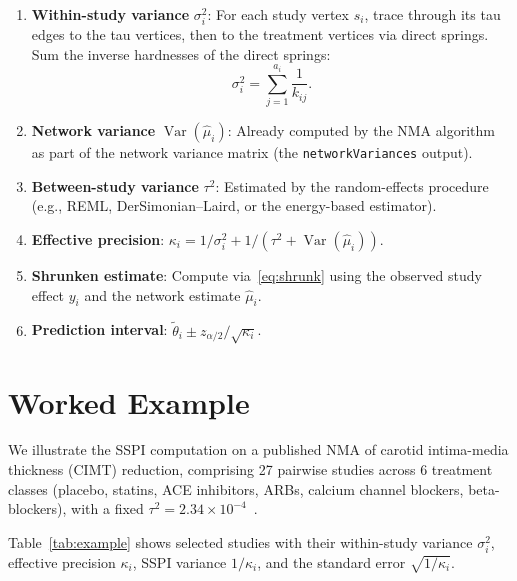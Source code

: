 \documentclass[12pt]{article}
\newcommand{\Var}{\operatorname{Var}}
\begin{document}
\begin{enumerate}
  \item \textbf{Within-study variance} $\sigma_i^2$: For each study
    vertex $s_i$, trace through its tau edges to the tau vertices, then
    to the treatment vertices via direct springs.  Sum the inverse
    hardnesses of the direct springs:
    \begin{equation}
      \sigma_i^2 = \sum_{j=1}^{a_i} \frac{1}{k_{ij}}.
    \end{equation}

  \item \textbf{Network variance} $\Var(\hat\mu_i)$: Already computed
    by the NMA algorithm as part of the network variance matrix
    (the \texttt{networkVariances} output).

  \item \textbf{Between-study variance} $\tau^2$: Estimated by the
    random-effects procedure (e.g., REML, DerSimonian--Laird, or the
    energy-based estimator).

  \item \textbf{Effective precision}:
    $\kappa_i = 1/\sigma_i^2 + 1/(\tau^2 + \Var(\hat\mu_i))$.

  \item \textbf{Shrunken estimate}: Compute via~\eqref{eq:shrunk}
    using the observed study effect $y_i$ and the network
    estimate $\hat\mu_i$.

  \item \textbf{Prediction interval}: $\tilde\theta_i \pm z_{\alpha/2}/\sqrt{\kappa_i}$.
\end{enumerate}


\section{Worked Example}\label{sec:example}

We illustrate the SSPI computation on a published NMA of carotid
intima-media thickness (CIMT) reduction, comprising 27 pairwise studies
across 6 treatment classes (placebo, statins, ACE inhibitors, ARBs,
calcium channel blockers, beta-blockers), with a fixed
$\tau^2 = 2.34 \times 10^{-4}$~\citep{Papakonstantinou2024}.

Table~\ref{tab:example} shows selected studies with their within-study
variance $\sigma_i^2$, effective precision $\kappa_i$, SSPI variance
$1/\kappa_i$, and the standard error $\sqrt{1/\kappa_i}$.
\end{document}
